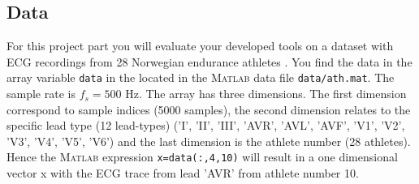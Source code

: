 \documentclass[12pt]{article}
\begin{document}
\subsection{Data}
\label{sec:data}

For this project part you will evaluate your developed tools on a dataset with ECG recordings from 28 Norwegian endurance athletes \cite{singstad2022norwegian,goldberger2000physiobank}. You find the data in the array variable \texttt{data} in the located in the \textsc{Matlab} data file \texttt{data/ath.mat}.  The sample rate is $f_s=500$ Hz.  The array has three dimensions. The first dimension correspond to sample indices (5000 samples), the second dimension relates to the specific lead type (12 lead-types) ('I', 'II', 'III', 'AVR', 'AVL', 'AVF', 'V1', 'V2', 'V3', 'V4', 'V5', 'V6') and the last dimension is the athlete number (28 athletes).  Hence the \textsc{Matlab} expression \texttt{x=data(:,4,10)} will result in a one dimensional vector x with the ECG trace from lead 'AVR' from athlete number 10. 
\end{document}
